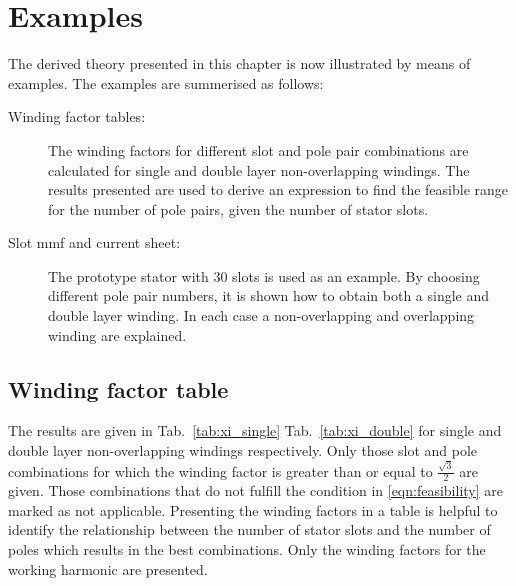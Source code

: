 \section{Examples}
The derived theory presented in this chapter is now illustrated by means of examples. The examples are summerised as follows:
\begin{description}
  \item[Winding factor tables:] The winding factors for different slot and pole pair combinations are calculated for single and double layer non-overlapping windings. The results presented are used to derive an expression to find the feasible range for the number of pole pairs, given the number of stator slots. 
  \item[Slot mmf and current sheet:] The prototype stator with 30 slots is used as an example. By choosing different pole pair numbers, it is shown how to obtain both a single and double layer winding. In each case a non-overlapping and overlapping winding are explained.
\end{description}
  
\subsection{Winding factor table}\label{subsec:wind_fac_table}
The results are given in Tab.~\ref{tab:xi_single} Tab.~\ref{tab:xi_double} for single and double layer non-overlapping windings respectively. Only those slot and pole combinations for which the winding factor is greater than or equal to $\frac{\sqrt{3}}{2}$ are given. Those combinations that do not fulfill the condition in \eqref{eqn:feasibility} are marked as not applicable. Presenting the winding factors in a table is helpful to identify the relationship between the number of stator slots and the number of poles which results in the best combinations. Only the winding factors for the working harmonic are presented. 

